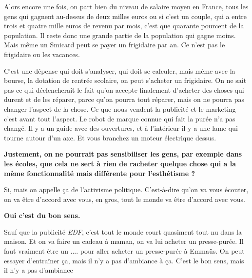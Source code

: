 \begin{small}
Alors encore une fois, on part bien du niveau de salaire moyen en France, tous les gens qui gagnent au-dessus de deux milles euros ou si c'est un couple, qui a entre trois et quatre mille euros de revenu par mois, c'est que quarante pourcent de la population. Il reste donc une grande partie de la population qui gagne moins. Mais même un Smicard peut se payer un frigidaire par an. Ce n'est pas le frigidaire ou les vacances. 

C'est une dépense qui doit s'analyser, qui doit se calculer, mais même avec la bourse, la dotation de rentrée scolaire, on peut s'acheter un frigidaire. On ne sait pas ce qui déclencherait le fait qu'on accepte finalement d'acheter des choses qui durent et de les réparer, parce qu'on pourra tout réparer, mais on ne pourra pas changer l'aspect de la chose. Ce que nous vendent la publicité et le marketing c'est avant tout l'aspect. Le robot de marque connue qui fait la purée n'a pas changé. Il y a un guide avec des ouvertures, et à l'intérieur il y a une lame qui tourne autour d'un axe. Et vous branchez un moteur électrique dessus.

\vspace{1\baselineskip}

\textbf{Justement, on ne pourrait pas sensibiliser les gens, par exemple dans les écoles, que cela ne sert à rien de racheter quelque chose qui a la même fonctionnalité mais différente pour l'esthétisme ?}

\vspace{1\baselineskip}

Si, mais on appelle ça de l'activisme politique. C'est-à-dire qu’on va vous écouter, on va être d'accord avec vous, en gros, tout le monde va être d'accord avec vous. 

\vspace{1\baselineskip}

\textbf{Oui c'est du bon sens.}

\vspace{1\baselineskip}

Sauf que la publicité \textit{EDF}, c'est tout le monde court quasiment tout nu dans la maison. Et on va faire un cadeau à maman, on va lui acheter un presse-purée. Il faut vraiment être un .... pour aller acheter un presse-purée à Emmaüs. On peut essayer d’entraîner ça, mais il n'y a pas d'ambiance à ça. C'est le bon sens, mais il n'y a pas d'ambiance

\vspace{1\baselineskip}


\end{small}
